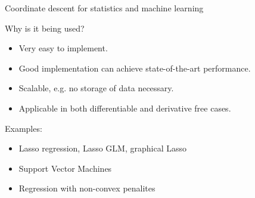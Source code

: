 \documentclass[11pt,compress,t,notes=noshow, xcolor=table]{beamer}
\begin{document}
\begin{vbframe}{Coordinate descent for statistics and machine learning}

Why is it being used?

\begin{itemize}
\item Very easy to implement.
\item Good implementation can achieve state-of-the-art performance.
\item Scalable, e.g. no storage of data necessary.
\item Applicable in both differentiable and derivative free cases.
\end{itemize}

Examples:

\begin{itemize}
\item Lasso regression, Lasso GLM, graphical Lasso
\item Support Vector Machines
\item Regression with non-convex penalites
\end{itemize}




\end{vbframe}


\endlecture
\end{document}
